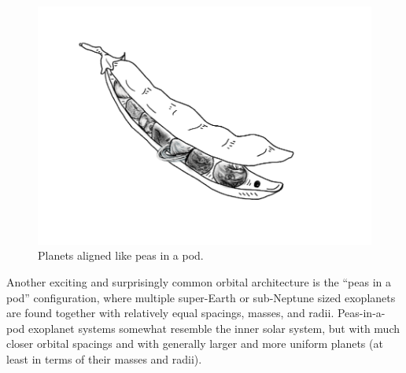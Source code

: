 \begin{figure}[h!]
    \centering
    \includegraphics[width=0.5\linewidth]{img/peapod_planet.png}
    \caption{Planets aligned like peas in a pod.}
    \label{fig:peapod_planet}
\end{figure}

Another exciting and surprisingly common orbital architecture is the ``peas in a pod'' configuration, where multiple super-Earth or sub-Neptune sized exoplanets are found together with relatively equal spacings, masses, and radii. Peas-in-a-pod exoplanet systems somewhat resemble the inner solar system, but with much closer orbital spacings and with generally larger and more uniform planets (at least in terms of their masses and radii).
